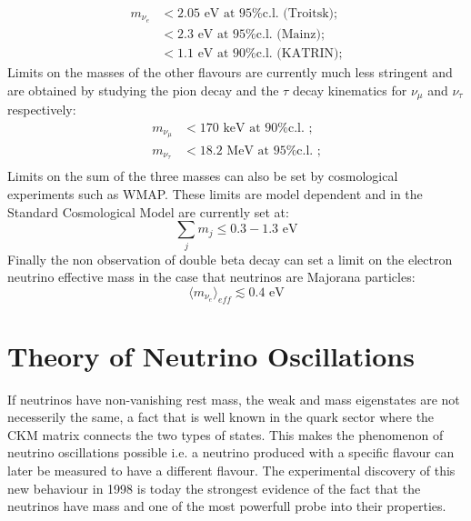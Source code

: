 \documentclass[12pt,a4paper,openright,twoside]{report}
\begin{document}
\begin{equation}
\begin{split}
m_{\nu_e} & < 2.05\text{ eV at 95\% c.l. (Troitsk);}\\
          & < 2.3\text{ eV at 95\% c.l. (Mainz);}\\
          & < 1.1\text{ eV at 90\% c.l. (KATRIN);}
\end{split}
\end{equation}
Limits on the masses of the other flavours are currently much less stringent and are obtained by studying the pion decay and the $\tau$ decay kinematics for $\nu_\mu$ and $\nu_\tau$ respectively: 
\begin{equation}
\begin{split}
m_{\nu_\mu} & < 170\text{ keV at 90\% c.l. ;}\\
m_{\nu_\tau}& < 18.2\text{ MeV at 95\% c.l. ;}\\
\end{split}
\end{equation}
Limits on the sum of the three masses can also be set by cosmological experiments such as WMAP. These limits are model dependent and in the Standard Cosmological Model are currently set at:
\begin{equation}
\sum_{j}m_j \leq 0.3-1.3 \text{ eV}
\end{equation}
Finally the non observation of double beta decay can set a limit on the electron neutrino effective mass in the case that neutrinos are Majorana particles:
\begin{equation}
\langle m_{\nu_e} \rangle _{eff} \lesssim 0.4 \text{ eV}
\end{equation}

\section{Theory of Neutrino Oscillations }
If neutrinos have non-vanishing rest mass, the weak and mass eigenstates are not necesserily the same, a fact that is well known in the quark sector where the CKM matrix connects the two types of states. This makes the phenomenon of neutrino oscillations possible i.e. a neutrino produced with a specific flavour can later be measured to have a different flavour. The experimental discovery of this new behaviour in 1998 is today the strongest evidence of the fact that the neutrinos have mass and one of the most powerfull probe into their properties.\\
\end{document}

